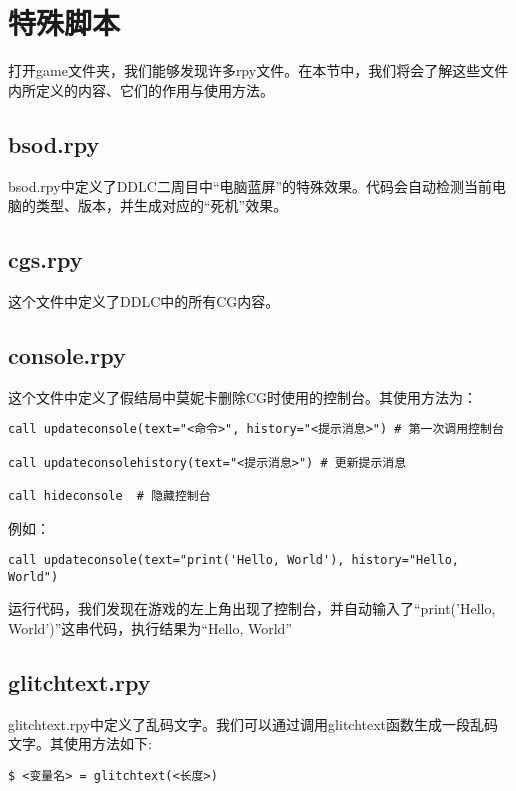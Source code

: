 \section{特殊脚本}

打开game文件夹，我们能够发现许多rpy文件。在本节中，我们将会了解这些文件内所定义的内容、它们的作用与使用方法。

\subsection{bsod.rpy}

bsod.rpy中定义了DDLC二周目中“电脑蓝屏”的特殊效果。代码会自动检测当前电脑的类型、版本，并生成对应的“死机”效果。


\subsection{cgs.rpy}

这个文件中定义了DDLC中的所有CG内容。


\subsection{console.rpy}

这个文件中定义了假结局中莫妮卡删除CG时使用的控制台。其使用方法为：
\begin{lstlisting}
call updateconsole(text="<命令>", history="<提示消息>") # 第一次调用控制台

call updateconsolehistory(text="<提示消息>") # 更新提示消息

call hideconsole  # 隐藏控制台
\end{lstlisting}

例如：
\begin{lstlisting}
call updateconsole(text="print('Hello, World'), history="Hello, World")
\end{lstlisting}

运行代码，我们发现在游戏的左上角出现了控制台，并自动输入了“print('Hello, World')”这串代码，执行结果为“Hello, World”

\subsection{glitchtext.rpy}

glitchtext.rpy中定义了乱码文字。我们可以通过调用glitchtext函数生成一段乱码文字。其使用方法如下:
\begin{lstlisting}
$ <变量名> = glitchtext(<长度>)
\end{lstlisting}


